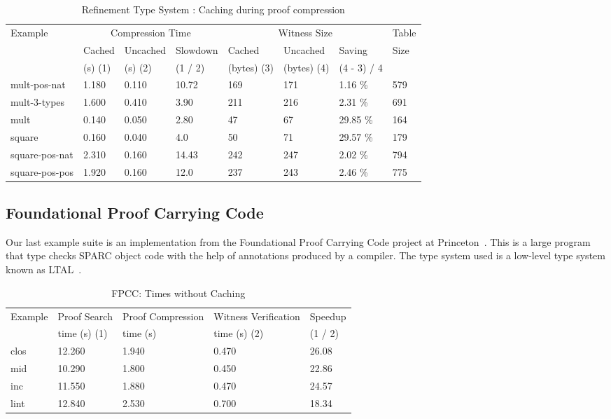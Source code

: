 \documentclass{llncs}
\begin{document}
\begin{table*}[htbp]
\begin{center}
\begin{small}
\begin{tabular}{|l|l|l|l|l|l|l|l|}
\hline
Example & \multicolumn{3}{c}{Compression Time} & 
\multicolumn{3}{c}{Witness Size} & Table\\
& Cached & Uncached & Slowdown & Cached & Uncached & Saving & Size\\
& (s) (1) & (s) (2) & (1 / 2) & (bytes) (3) & (bytes) (4) & (4 - 3) / 4& \\
\hline
mult-pos-nat & 1.180 & 0.110 & 10.72 & 169 & 171 & 1.16 \% & 579\\
mult-3-types & 1.600 & 0.410 & 3.90 & 211 & 216 & 2.31 \% & 691\\
mult & 0.140 & 0.050 & 2.80 & 47 & 67 & 29.85 \% & 164\\
square & 0.160 & 0.040 & 4.0  & 50 & 71 & 29.57 \% & 179\\
square-pos-nat & 2.310 & 0.160 & 14.43 & 242 & 247 & 2.02 \% & 794\\
square-pos-pos & 1.920 & 0.160 & 12.0 & 237 & 243 & 2.46 \% & 775\\
\hline
\end{tabular}
\end{small}
\end{center}
\caption{\label{tab:refcache} 
Refinement Type System : 
Caching during proof compression}
\end{table*}

\subsection{Foundational Proof Carrying Code}
Our last example suite is an implementation from the Foundational 
Proof Carrying Code project at Princeton~\cite{Appel01lics}. This 
is a large program that type checks SPARC object code with the help 
of annotations produced by a compiler. The type system used is a
low-level type system known as LTAL~\cite{chen+:fpcc-ltal}.

\begin{table*}[htbp]
\begin{center}
\begin{small}
\begin{tabular}{|l|l|l|l|l|}
\hline
Example & Proof Search & Proof Compression & Witness Verification & Speedup\\
& time (s) (1) & time (s) & time (s) (2) & (1 / 2) \\
\hline
clos & 12.260 & 1.940 & 0.470 & 26.08\\
mid & 10.290 & 1.800 & 0.450 & 22.86\\
inc & 11.550 & 1.880 & 0.470 & 24.57\\
lint & 12.840 & 2.530 & 0.700 & 18.34\\
\hline
\end{tabular}
\end{small}
\end{center}
\caption{\label{tab:fpcctimes}
FPCC: Times without Caching}
\end{table*}
\end{document}
